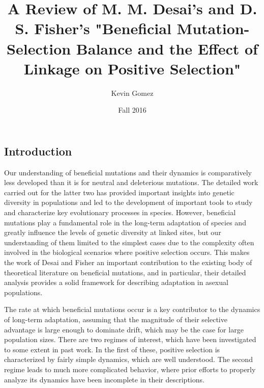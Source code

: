 \documentclass[12pt]{article}
\title{A Review of M. M. Desai's and D. S. Fisher's "Beneficial Mutation-Selection Balance and the Effect of Linkage on Positive Selection"}
\date{Fall 2016}
\author{Kevin Gomez}
\begin{document}
\maketitle
\newpage


\newpage
\subsection*{Introduction}
Our understanding of beneficial mutations and their dynamics is comparatively less developed than it is for neutral and deleterious mutations.  The detailed work carried out for the latter two has provided important insights into genetic diversity in populations and led to the development of important tools to study and characterize key evolutionary processes in species.  However, beneficial mutations play a fundamental role in the long-term adaptation of species and greatly influence the levels of genetic diversity at linked sites, but our understanding of them limited to the simplest cases due to the complexity often involved in the biological scenarios where positive selection occurs.  This makes the work of Desai and Fisher an important contribution to the existing body of theoretical literature on beneficial mutations, and in particular, their detailed analysis provides a solid framework for describing adaptation in asexual populations.  

The rate at which beneficial mutations occur is a key contributor to the dynamics of long-term adaptation, assuming that the magnitude of their selective advantage is large enough to dominate drift, which may be the case for large population sizes.  There are two regimes of interest, which have been investigated to some extent in past work.  In the first of these, positive selection is characterized by fairly simple dynamics, which are well understood.  The second regime leads to much more complicated behavior, where prior efforts to properly analyze its dynamics have been incomplete in their descriptions.        

 
\end{document}
